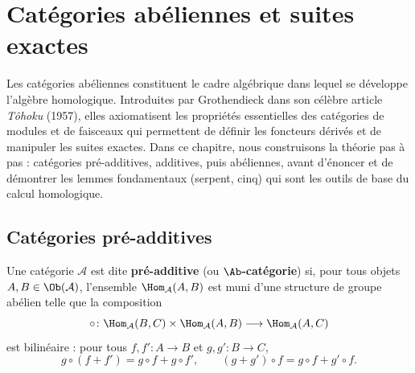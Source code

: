 

\chapter{Catégories abéliennes et suites exactes}\label{ch:abeliennes}
\minitoc

\vspace{1em}

Les catégories abéliennes constituent le cadre
algébrique dans lequel se développe l'algèbre homologique. Introduites par
Grothendieck dans son célèbre article
\emph{Tôhoku} (1957), elles axiomatisent les
propriétés essentielles des catégories de modules et de faisceaux qui
permettent de définir les foncteurs dérivés et de manipuler les suites
exactes. Dans ce chapitre, nous construisons la théorie pas à pas : catégories
pré-additives, additives, puis abéliennes, avant d'énoncer et de démontrer
les lemmes fondamentaux (serpent, cinq) qui sont les outils de base
du calcul homologique.


\section{Catégories pré-additives}\label{sec:preadditive}

\begin{definition}\label{def:preadditive}
Une catégorie $\mathcal{A}$ est dite \textbf{pré-additive}
(ou \textbf{$\Ab$-catégorie})
si, pour tous objets $A, B \in \Ob(\mathcal{A})$,
l'ensemble $\Hom_{\mathcal{A}}(A, B)$ est muni d'une structure de
groupe abélien telle que la composition
\[
  \circ \colon \Hom_{\mathcal{A}}(B, C) \times \Hom_{\mathcal{A}}(A, B)
  \longrightarrow \Hom_{\mathcal{A}}(A, C)
\]
est bilinéaire :
pour tous $f, f' \colon A \to B$ et $g, g' \colon B \to C$,
\[
  g \circ (f + f') = g \circ f + g \circ f', \qquad
  (g + g') \circ f = g \circ f + g' \circ f.
\]
\end{definition}

